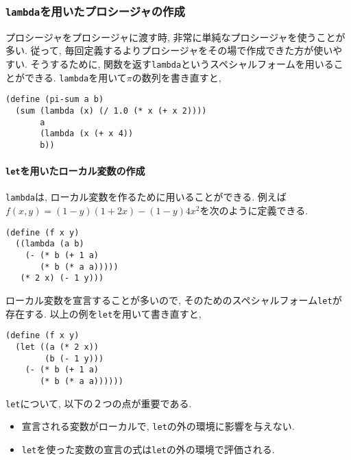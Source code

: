 \subsubsection{\lstinline{lambda}を用いたプロシージャの作成}
プロシージャをプロシージャに渡す時, 非常に単純なプロシージャを使うことが多い.
従って, 毎回定義するよりプロシージャをその場で作成できた方が使いやすい.
そうするために, 関数を返す\lstinline{lambda}というスペシャルフォームを用いることができる.
\lstinline{lambda}を用いて$\pi$の数列を書き直すと,

\begin{lstlisting}[basicstyle=\footnotesize,title=一般的な和の関数と\lstinline{lambda}を用いた$\pi$の数列]
(define (pi-sum a b)
  (sum (lambda (x) (/ 1.0 (* x (+ x 2))))
       a
       (lambda (x (+ x 4))
       b))
\end{lstlisting}

\paragraph{\lstinline{let}を用いたローカル変数の作成} \lstinline{lambda}は,
ローカル変数を作るために用いることができる. 例えば$f(x,y) = (1-y)(1+2x) - (1-y)4x^2$を次のように定義できる.

\begin{lstlisting}[basicstyle=\footnotesize]
(define (f x y)
  ((lambda (a b)
    (- (* b (+ 1 a)
       (* b (* a a)))))
   (* 2 x) (- 1 y)))
\end{lstlisting}

ローカル変数を宣言することが多いので, そのためのスペシャルフォーム\lstinline{let}が存在する.
以上の例を\lstinline{let}を用いて書き直すと,

\begin{lstlisting}[basicstyle=\footnotesize]
(define (f x y)
  (let ((a (* 2 x))
        (b (- 1 y)))
    (- (* b (+ 1 a)
       (* b (* a a))))))
\end{lstlisting}

\lstinline{let}について, 以下の２つの点が重要である.

\begin{itemize}
\item 宣言される変数がローカルで, \lstinline{let}の外の環境に影響を与えない.
\item \lstinline{let}を使った変数の宣言の式は\lstinline{let}の外の環境で評価される.
\end{itemize}
